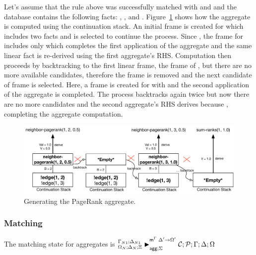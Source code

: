 Let's assume that the rule above was successfully matched with  and
 and the database contains the following facts: , ,  and
. Figure~\ref{fig:logic:backtrack} shows how
the aggregate is computed using the continuation stack. An initial frame is
created for  which includes two  facts and
 is selected to continue the process. Since ,
the frame for  includes only
 which completes the first application of the
aggregate and the same linear fact is re-derived using the first aggregate's
RHS.  Computation then proceeds by backtracking to the first linear frame, the
frame of , but there are no more available
candidates, therefore the frame is removed and the next candidate  of frame  is selected. Here, a frame is
created for  with  and the second
application of the aggregate is completed. The process backtracks again twice
but now there are no more candidates and the second aggregate's RHS derives
 because , completing the aggregate
computation.

\begin{figure}[ht]
   \begin{center}
      \includegraphics[width=0.85\linewidth]{figures/logical_foundations/backtrack.pdf}
   \end{center}
   \caption{Generating the PageRank aggregate.}
   \label{fig:logic:backtrack}
\end{figure}

\subsubsection{Matching}

The matching state for aggregates is 
$\matstatea{\Delta_N}{\lstack{C};
   \lstack{P}}{\Gamma}{\Delta}{\Omega}{\Delta' \rightarrow \Omega'}{\Sigma}$

